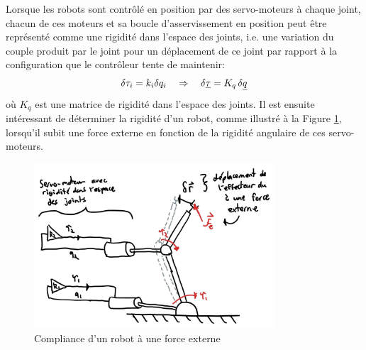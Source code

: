 Lorsque les robots sont contrôlé en position par des servo-moteurs à chaque joint, chacun de ces moteurs et sa boucle d'asservissement en position peut être représenté comme une rigidité dans l'espace des joints, i.e. une variation du couple produit par le joint pour un déplacement de ce joint par rapport à la configuration que le contrôleur tente de maintenir:
\begin{align}
\delta \tau_i = k_i \delta q_i \quad \Rightarrow \quad \delta \underline{\tau} = K_q \, \delta \underline{q}
\end{align}
où $K_q$ est une matrice de rigidité dans l'espace des joints. Il est ensuite intéressant de déterminer la rigidité d'un robot, comme illustré à la Figure \ref{fig:robotcompliance}, lorsqu'il subit une force externe en fonction de la rigidité angulaire de ces servo-moteurs.
\begin{figure}[htbp]
	\centering
		\includegraphics[width=0.80\textwidth]{fig/robotcompliance.jpg}
	\caption{Compliance d'un robot à une force externe}
	\label{fig:robotcompliance}
\end{figure}


